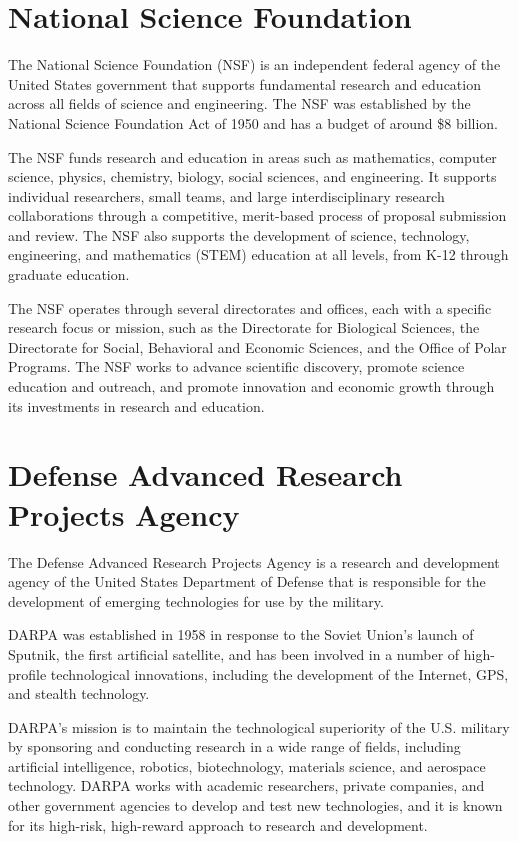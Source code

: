 \documentclass[
]{book}
\begin{document}
\hypertarget{nsf}{%
\section{National Science Foundation}\label{nsf}}

The National Science Foundation (NSF) is an independent federal agency of the United States government that supports fundamental research and education across all fields of science and engineering. The NSF was established by the National Science Foundation Act of 1950 and has a budget of around \$8 billion.

The NSF funds research and education in areas such as mathematics, computer science, physics, chemistry, biology, social sciences, and engineering. It supports individual researchers, small teams, and large interdisciplinary research collaborations through a competitive, merit-based process of proposal submission and review. The NSF also supports the development of science, technology, engineering, and mathematics (STEM) education at all levels, from K-12 through graduate education.

The NSF operates through several directorates and offices, each with a specific research focus or mission, such as the Directorate for Biological Sciences, the Directorate for Social, Behavioral and Economic Sciences, and the Office of Polar Programs. The NSF works to advance scientific discovery, promote science education and outreach, and promote innovation and economic growth through its investments in research and education.

\hypertarget{darpa}{%
\section{Defense Advanced Research Projects Agency}\label{darpa}}

The Defense Advanced Research Projects Agency is a research and development agency of the United States Department of Defense that is responsible for the development of emerging technologies for use by the military.

DARPA was established in 1958 in response to the Soviet Union's launch of Sputnik, the first artificial satellite, and has been involved in a number of high-profile technological innovations, including the development of the Internet, GPS, and stealth technology.

DARPA's mission is to maintain the technological superiority of the U.S. military by sponsoring and conducting research in a wide range of fields, including artificial intelligence, robotics, biotechnology, materials science, and aerospace technology. DARPA works with academic researchers, private companies, and other government agencies to develop and test new technologies, and it is known for its high-risk, high-reward approach to research and development.
\end{document}
